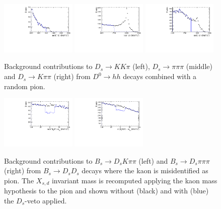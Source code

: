 \begin{figure}[h]
\centering
\includegraphics[height=!,width=0.32\textwidth]{figs/BkgStudies/norm_Ds2KKpi_as_D02KK_compareVeto.pdf} 
\includegraphics[height=!,width=0.32\textwidth]{figs/BkgStudies/norm_Ds2pipipi_as_D02pipi_compareVeto.pdf} 
\includegraphics[height=!,width=0.32\textwidth]{figs/BkgStudies/norm_Ds2Kpipi_as_D02Kpi_compareVeto.pdf} 
\caption{Background contributions to $D_s \to KK\pi$ (left), $D_s \to \pi\pi\pi$ (middle) and $D_s \to K\pi\pi$ (right) from $D^0\to hh$ decays combined with a random pion. }
\label{fig:vetoD0}
\end{figure}
\begin{figure}[h]
\centering
\includegraphics[height=!,width=0.32\textwidth]{figs/BkgStudies/signal_Bs2DsKpipi_as_Bs2DsDs_compareVeto.pdf} 
\includegraphics[height=!,width=0.32\textwidth]{figs/BkgStudies/norm_Bs2Dspipipi_as_Bs2DsDs_compareVeto.pdf} 
\caption{Background contributions to  $B_s \to D_s K\pi\pi$ (left) and $B_s \to D_s \pi\pi\pi$ (right) from $B_s \to D_s D_s$ decays where the kaon is misidentified as pion.
The $X_{s,d}$ invariant mass is recomputed applying the kaon mass hypothesis to the pion and shown without (black) and with (blue) the $D_s$-veto applied. 
}
\label{fig:vetoDs}
\end{figure}



